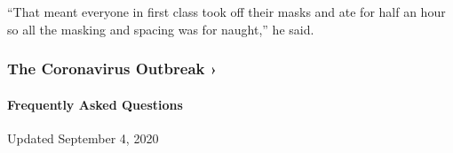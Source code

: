 ``That meant everyone in first class took off their masks and ate for
half an hour so all the masking and spacing was for naught,'' he said.

\href{https://www.nytimes3xbfgragh.onion/news-event/coronavirus?action=click\&pgtype=Article\&state=default\&region=MAIN_CONTENT_3\&context=storylines_faq}{}

\hypertarget{the-coronavirus-outbreak-}{%
\subsubsection{The Coronavirus Outbreak
›}\label{the-coronavirus-outbreak-}}

\hypertarget{frequently-asked-questions}{%
\paragraph{Frequently Asked
Questions}\label{frequently-asked-questions}}

Updated September 4, 2020

